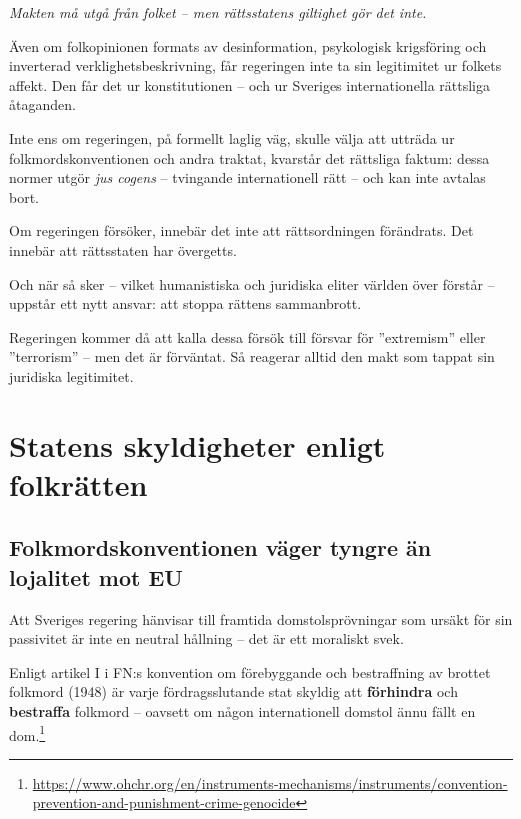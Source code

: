 \vspace{1em}
\textit{Makten må utgå från folket – men rättsstatens giltighet gör det inte.}

Även om folkopinionen formats av desinformation, psykologisk krigsföring och inverterad verklighetsbeskrivning, får regeringen inte ta sin legitimitet ur folkets affekt. Den får det ur konstitutionen – och ur Sveriges internationella rättsliga åtaganden.

Inte ens om regeringen, på formellt laglig väg, skulle välja att utträda ur folkmordskonventionen och andra traktat, kvarstår det rättsliga faktum: dessa normer utgör \textit{jus cogens} – tvingande internationell rätt – och kan inte avtalas bort.

Om regeringen försöker, innebär det inte att rättsordningen förändrats. Det innebär att rättsstaten har övergetts.

Och när så sker – vilket humanistiska och juridiska eliter världen över förstår – uppstår ett nytt ansvar: att stoppa rättens sammanbrott.

\vspace{1em}
Regeringen kommer då att kalla dessa försök till försvar för ”extremism” eller ”terrorism” – men det är förväntat. Så reagerar alltid den makt som tappat sin juridiska legitimitet.






\section*{Statens skyldigheter enligt folkrätten}
\subsection*{Folkmordskonventionen väger tyngre än lojalitet mot EU}

Att Sveriges regering hänvisar till framtida domstolsprövningar som ursäkt för sin passivitet är inte en neutral hållning – det är ett moraliskt svek.

Enligt artikel I i FN:s konvention om förebyggande och bestraffning av brottet folkmord (1948) är varje fördragsslutande stat skyldig att \textbf{förhindra} och \textbf{bestraffa} folkmord – oavsett om någon internationell domstol ännu fällt en dom.\footnote{\url{https://www.ohchr.org/en/instruments-mechanisms/instruments/convention-prevention-and-punishment-crime-genocide}}

